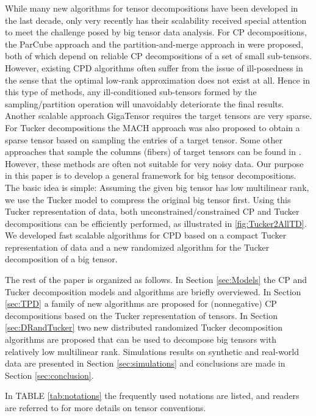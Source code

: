 \documentclass[10pt,twocolumn,twoside]{IEEEtran}
\begin{document}
While many new algorithms for tensor decompositions have been developed in the last decade, only very recently has their scalability received special attention to meet the challenge posed by big tensor data analysis. For CP decompositions, the ParCube approach  \cite{ParCube} and the partition-and-merge approach in \cite{gridPARAFAC} were proposed, both of which depend on reliable CP decompositions of a set of small sub-tensors. However, existing CPD algorithms often suffer from the issue of ill-posedness in the sense that the optimal low-rank approximation does not exist at all. Hence in this type of methods, any ill-conditioned sub-tensors  formed by the sampling/partition operation  will unavoidably deteriorate  the final results. Another scalable approach GigaTensor \cite{GigaTensor} requires the target tensors are very sparse. For Tucker decompositions the MACH approach \cite{MACH} was also proposed to obtain a sparse tensor based on sampling the entries of a target tensor. Some other approaches that sample the columns (fibers) of target tensors can be found in \cite{randTenSVD,CURTensorCaiafaC2010}. However, these methods are often not suitable for very noisy data. Our purpose in this paper is to develop a general framework for big tensor decompositions. The basic idea is simple: Assuming the given big tensor has low multilinear rank, we use the Tucker model to compress the original big tensor first. Using this Tucker representation of data, both unconstrained/constrained CP and Tucker decompositions can be efficiently performed, as illustrated in \figurename \ref{fig:Tucker2AllTD}. We developed fast scalable algorithms for CPD based on a compact Tucker representation of data and  a new randomized algorithm for the Tucker decomposition of a big tensor. 

The rest of the paper is organized as follows. In Section \ref{sec:Models} the CP and Tucker decomposition models and algorithms are briefly overviewed. In Section \ref{sec:TPD} a family of new algorithms are proposed for (nonnegative) CP decompositions based on the Tucker representation of tensors. In Section \ref{sec:DRandTucker} two new distributed randomized Tucker decomposition algorithms are proposed that can be used to decompose big tensors with relatively low multilinear rank. Simulations results on synthetic and real-world data are presented in Section \ref{sec:simulations} and conclusions are made in Section \ref{sec:conclusion}.




In TABLE \ref{tab:notations} the frequently used notations are listed, and readers are referred to  \cite{Kolda09tensordecompositions, nmfbookCA} for more details on tensor conventions.
\end{document}
